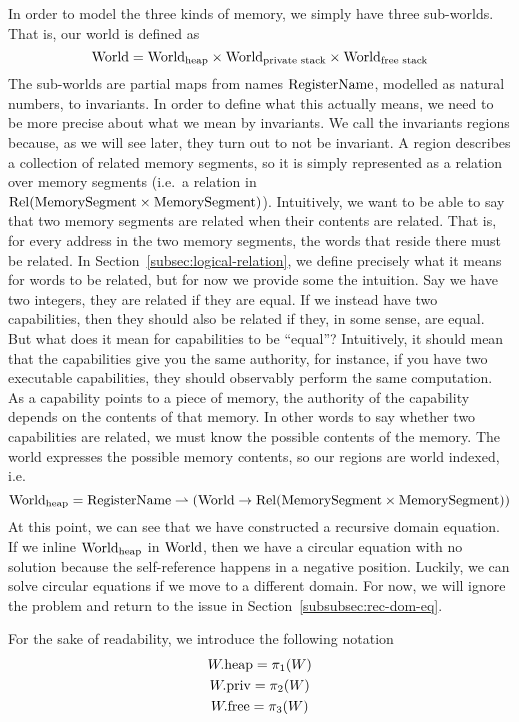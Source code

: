 \begin{jversion}
In order to model the three kinds of memory, we simply have three sub-worlds.
That is, our world is defined as
\[
  \mathrm{World} = \mathrm{World}_\mathrm{heap} \times \mathrm{World}_\text{private stack} \times \mathrm{World}_\text{free stack}
\]
The sub-worlds are partial maps from names $\mathrm{RegisterName}$, modelled as natural numbers, to invariants.
In order to define what this actually means, we need to be more precise about what we mean by invariants.
We call the invariants regions because, as we will see later, they turn out to not be invariant.
A region describes a collection of related memory segments, so it is simply represented as a relation over memory segments (i.e.\ a relation in $\mathrm{Rel}(\mathrm{MemorySegment} \times \mathrm{MemorySegment})$).
Intuitively, we want to be able to say that two memory segments are related when their contents are related.
That is, for every address in the two memory segments, the words that reside there must be related.
In Section~\ref{subsec:logical-relation}, we define precisely what it means for words to be related, but for now we provide some the intuition.
Say we have two integers, they are related if they are equal.
If we instead have two capabilities, then they should also be related if they, in some sense, are equal.
But what does it mean for capabilities to be ``equal''?
Intuitively, it should mean that the capabilities give you the same authority, for instance, if you have two executable capabilities, they should observably perform the same computation.
As a capability points to a piece of memory, the authority of the capability depends on the contents of that memory.
In other words to say whether two capabilities are related, we must know the possible contents of the memory.
The world expresses the possible memory contents, so our regions are world indexed, i.e.
\[
  \mathrm{World}_\mathrm{heap} = \mathrm{RegisterName} \rightharpoonup (\mathrm{World} \rightarrow \mathrm{Rel}(\mathrm{MemorySegment} \times \mathrm{MemorySegment}))
\]
At this point, we can see that we have constructed a recursive domain equation.
If we inline $\mathrm{World}_\mathrm{heap}$ in $\mathrm{World}$, then we have a circular equation with no solution because the self-reference happens in a negative position.
Luckily, we can solve circular equations if we move to a different domain.
For now, we will ignore the problem and return to the issue in Section~\ref{subsubsec:rec-dom-eq}.

For the sake of readability, we introduce the following notation
\begin{gather*}
  W.\mathrm{heap} = \pi_1(W)\\
  W.\mathrm{priv} = \pi_2(W)\\
  W.\mathrm{free} = \pi_3(W)
\end{gather*}

\end{jversion}
